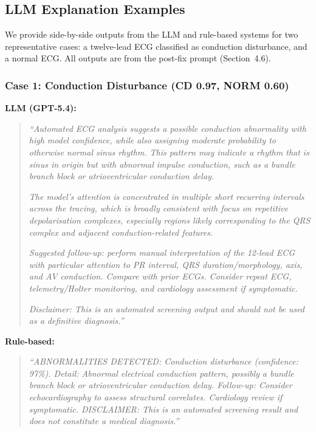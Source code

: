 \documentclass[10pt]{article}
\begin{document}
\subsection{LLM Explanation Examples}
\label{sec:llm_examples}

We provide side-by-side outputs from the LLM and rule-based systems for two representative cases: a twelve-lead ECG classified as conduction disturbance, and a normal ECG. All outputs are from the post-fix prompt (Section~4.6).

\subsubsection*{Case 1: Conduction Disturbance (CD 0.97, NORM 0.60)}

\textbf{LLM (GPT-5.4):}
\begin{quote}
\small
\textit{``Automated ECG analysis suggests a possible conduction abnormality with high model confidence, while also assigning moderate probability to otherwise normal sinus rhythm. This pattern may indicate a rhythm that is sinus in origin but with abnormal impulse conduction, such as a bundle branch block or atrioventricular conduction delay.}

\textit{The model's attention is concentrated in multiple short recurring intervals across the tracing, which is broadly consistent with focus on repetitive depolarisation complexes, especially regions likely corresponding to the QRS complex and adjacent conduction-related features.}

\textit{Suggested follow-up: perform manual interpretation of the 12-lead ECG with particular attention to PR interval, QRS duration/morphology, axis, and AV conduction. Compare with prior ECGs. Consider repeat ECG, telemetry/Holter monitoring, and cardiology assessment if symptomatic.}

\textit{Disclaimer: This is an automated screening output and should not be used as a definitive diagnosis.''}
\end{quote}

\textbf{Rule-based:}
\begin{quote}
\small
\textit{``ABNORMALITIES DETECTED: Conduction disturbance (confidence: 97\%). Detail: Abnormal electrical conduction pattern, possibly a bundle branch block or atrioventricular conduction delay. Follow-up: Consider echocardiography to assess structural correlates. Cardiology review if symptomatic. DISCLAIMER: This is an automated screening result and does not constitute a medical diagnosis.''}
\end{quote}
\end{document}
